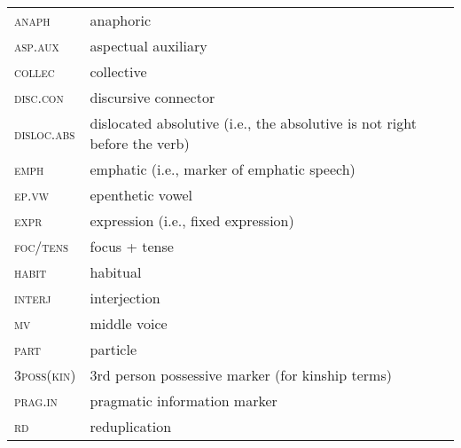 \documentclass[output=paper,
modfonts,nonflat
]{langsci/langscibook}
\begin{document}
\begin{tabular}{ll}

\textsc{anaph} & anaphoric                                                       \\
\textsc{asp.aux}     & aspectual auxiliary                                                       \\
\textsc{collec}    & collective\\  
\textsc{disc.con}    & discursive connector                                                      \\
\textsc{disloc.abs} & dislocated absolutive (i.e., the absolutive is not right before the verb) \\
\textsc{emph}       & emphatic (i.e., marker of emphatic speech)                                \\
\textsc{ep.vw}       & epenthetic vowel                                                          \\
\textsc{expr}       & expression (i.e., fixed expression)                                       \\
\textsc{foc/tens}   & focus + tense                                                             \\
\textsc{habit}   & habitual                                                                     \\
\textsc{interj}   & interjection                                                                \\
\textsc{mv}         & middle voice                                                              \\
\textsc{part}       & particle                                                                  \\
\textsc{3poss(kin)}       & 3rd person possessive marker (for kinship terms)                    \\
\textsc{prag.in}     & pragmatic information marker                                              \\
\textsc{rd}         & reduplication                       
\end{tabular} 
 
{\sloppy
\printbibliography[heading=subbibliography,notkeyword=this]
}
\end{document}
